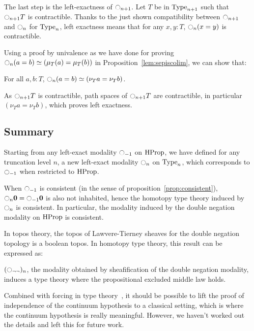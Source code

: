 The last step is the left-exactness of $\ocircle_{n+1}$. Let $T$ be in
$\operatorname{Type}_{n+1}$ such that $\ocircle_{n+1} T$ is contractible.  Thanks to the just
shown compatibility between $\ocircle_{n+1}$ and $\ocircle_n$ for
$\operatorname{Type}_n$, left exactness means that for any $x,y: T$,
$\ocircle_n(x=y)$ is contractible.

Using a proof by univalence as we have done for proving $\ocircle_n (a=b) \simeq (\mu_T(a) =
\mu_T (b))$ in Proposition~\ref{lem:sepiscolim}, we can show that:
\begin{prop}
  For all $a,b:T$, $\ocircle_n(a=b) \simeq (\nu_T a = \nu_T b)$.
\end{prop}

As $\ocircle_{n+1} T$ is contractible, path spaces of $\ocircle_{n+1} T$ are
contractible, in particular $(\nu_T a=\nu_T b)$, which proves left
exactness.


\subsection{Summary}
\label{ssec:summary}

Starting from any left-exact modality $\ocircle_{-1}$ on $\operatorname{HProp}$, we
have defined for any truncation level $n$, a new left-exact modality
$\ocircle_n$ on $\operatorname{Type}_n$, which corresponds to $\ocircle_{-1}$ when
restricted to $\operatorname{HProp}$.


When $\ocircle_{-1}$ is consistent (in the sense of
proposition~\ref{prop:consistent}), 
$\ocircle_{n}\mathbf{0}=\ocircle_{-1}\mathbf{0}$ is also not inhabited, hence the homotopy type theory induced by
$\ocircle_n$ is consistent. 
%
In particular, the modality induced by the double negation modality on
$\operatorname{HProp}$ is consistent.

In topos theory, the topos of Lawvere-Tierney sheaves for the double
negation topology is a boolean topos. In homotopy type theory, this
result can be expressed as:

\begin{prop}
  $(\ocircle_{\lnot\lnot})_n$, the modality obtained by sheafification
  of the double negation modality,
  induces a type theory where the propositional excluded middle law holds.
\end{prop}

Combined with forcing in type theory~\cite{jaber2012extending}, it
should be possible to lift the proof of independence of the continuum
hypothesis to a classical setting, which is where the continuum hypothesis is
really meaningful.  However, we haven't worked out the details and left
this for future work.



